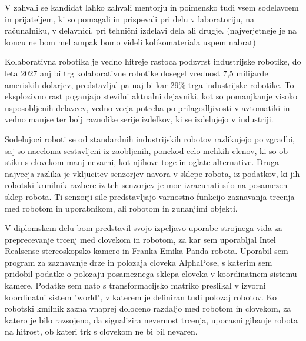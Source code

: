 \documentclass[a4paper,twoside,openright,12pt,slovene]{book}
\date{Ljubljana, \the\year}
\begin{document}
\frontmatter


\maketitle

\zahvala
V zahvali se kandidat lahko zahvali mentorju in poimensko tudi vsem sodelavcem in prijateljem, ki so pomagali in prispevali pri delu v laboratoriju, na računalniku, v delavnici, pri tehnični izdelavi dela ali drugje.
(najverjetneje je na koncu ne bom mel ampak bomo videli kolikomateriala uspem nabrat)

\povzetek
Kolaborativna robotika je vedno hitreje rastoca podzvrst industrijske robotike, do leta 2027 anj bi trg kolaborativne robotike dosegel vrednost 7,5 milijarde ameriskih dolarjev, predstavljal pa naj bi kar 29\%
trga industrijske robotike.
To eksplozivno rast poganjajo stevilni aktualni dejavniki, kot so pomanjkanje visoko usposobljenih delavcev, vedno vecja potreba po prilagodljivosti v avtomatiki in vedno manjse ter bolj raznolike serije izdelkov, ki se izdelujejo v industriji.

Sodelujoci roboti se od standardnih industrijskih robotov razlikujejo po zgradbi, saj so naceloma sestavljeni iz zaobljenih, ponekod celo mehkih clenov, ki so ob stiku s clovekom manj nevarni, kot njihove toge in oglate alternative. Druga najvecja razlika je vkljucitev senzorjev navora v sklepe robota, iz podatkov, ki jih robotski krmilnik razbere iz teh senzorjev je moc izracunati silo na posamezen sklep robota. Ti senzorji sile predstavljajo varnostno funkcijo zaznavanja trcenja med robotom in uporabnikom, ali robotom in zunanjimi objekti.

V diplomskem delu bom predstavil svojo izpeljavo uporabe strojnega vida za preprecevanje trcenj med clovekom in robotom, za kar sem uporabljal Intel Realsense stereoskopsko kamero in Franka Emika Panda robota. Uporabil sem program za zaznavanje drze in polozaja cloveka AlphaPose, s katerim sem pridobil podatke o polozaju posameznega sklepa cloveka v koordinatnem sistemu kamere. Podatke sem nato s transformacijsko matriko preslikal v izvorni koordinatni sistem "world", v katerem je definiran tudi polozaj robotov. Ko robotski kmilnik zazna vnaprej doloceno razdaljo med robotom in clovekom, za katero je bilo razsojeno, da signalizira nevernost trcenja, upocasni gibanje robota na hitrost, ob kateri trk s clovekom ne bi bil nevaren.
\end{document}
